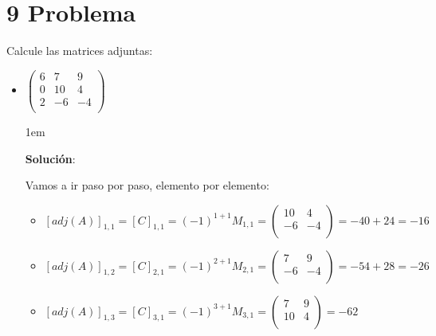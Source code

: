 \documentclass[12pt, fleqn]{article}                             %
\newenvironment{SmallIndentation}[1][0.75em]                    %
        {\begin{adjustwidth}{#1}{}\begin{footnotesize}}             %
        {\end{footnotesize}\end{adjustwidth}}                       %
\theoremstyle{break}                                            %
\newcommand{\pVector}[1]                                        %
        { \ensuremath{\begin{pmatrix}#1\end{pmatrix}} }             %
\begin{document}
\clearpage
\section{9 Problema}

    Calcule las matrices adjuntas:
    \begin{itemize}
        
        \item 
            $\pVector{
                6 & 7 &9    \\ 
                0 & 10 & 4  \\
                2 & -6 & -4 \\
                }$

            \begin{SmallIndentation}[1em]
                \textbf{Solución}:

                Vamos a ir paso por paso, elemento por elemento:
                \begin{itemize}
                    
                    \item
                        $[adj(A)]_{1, 1} 
                            = [C]_{1, 1} 
                            = (-1)^{1+1} M_{1, 1}
                            = \pVector{
                                10 & 4  \\
                                -6 & -4 \\
                                }
                            = -40 + 24 = -16$

                    \item
                        $[adj(A)]_{1, 2} 
                            = [C]_{2, 1} 
                            = (-1)^{2+1} M_{2, 1}
                            = \pVector{
                                7 & 9   \\ 
                                -6 & -4 \\
                                }
                            = -54 + 28 = -26$

                    \item
                        $[adj(A)]_{1, 3} 
                            = [C]_{3, 1} 
                            = (-1)^{3+1} M_{3, 1}
                            = \pVector{
                                7 &9    \\ 
                                10 & 4  \\
                            }
                            = -62$


\end{itemize}
\end{SmallIndentation}
\end{itemize}
\end{document}
